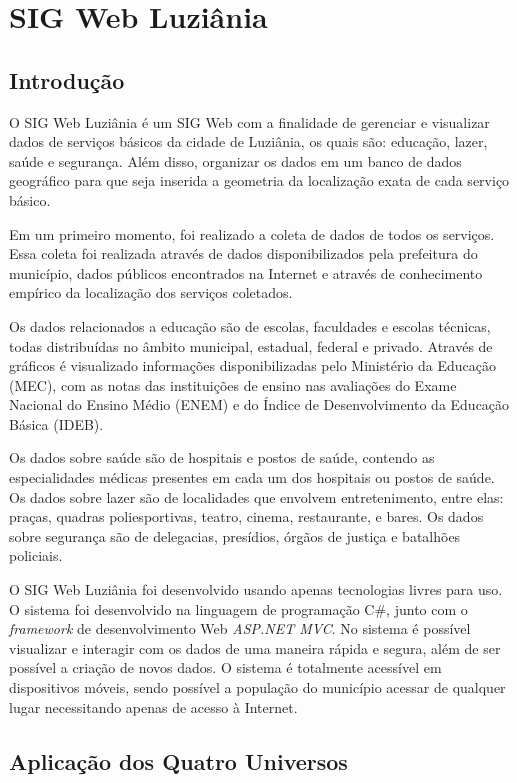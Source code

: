 \chapter{SIG Web Luziânia}
\label{cap:sigluziania}

\section{Introdução}

O SIG Web Luziânia é um SIG Web com a finalidade de gerenciar e visualizar  dados de serviços básicos da cidade de Luziânia, os quais são: educação, lazer, saúde e segurança. Além disso, organizar os dados em um banco de dados geográfico para que seja inserida a geometria da localização exata de cada serviço básico.

Em um primeiro momento, foi realizado a coleta de dados de todos os serviços. Essa coleta foi realizada através de dados disponibilizados pela prefeitura do município, dados públicos encontrados na Internet e através de conhecimento empírico da localização dos serviços coletados.

Os dados relacionados a educação são de escolas, faculdades e escolas técnicas, todas distribuídas no âmbito municipal, estadual, federal e privado. Através de gráficos é visualizado informações disponibilizadas pelo Ministério da Educação (MEC), com as notas das instituições de ensino nas avaliações do Exame Nacional do Ensino Médio (ENEM) e do Índice de Desenvolvimento da Educação Básica (IDEB).

Os dados sobre saúde são de hospitais e postos de saúde, contendo as especialidades médicas presentes em cada um dos hospitais ou postos de saúde. Os dados sobre lazer são de localidades que envolvem entretenimento, entre elas: praças, quadras poliesportivas, teatro, cinema, restaurante, e bares. Os dados sobre segurança são de delegacias, presídios, órgãos de justiça e batalhões policiais.

O SIG Web Luziânia foi desenvolvido usando apenas tecnologias livres para uso. O sistema foi desenvolvido na linguagem de programação C\#, junto com o \textit{framework} de desenvolvimento Web \textit{ASP.NET MVC}. No sistema é possível visualizar e interagir com os dados de uma maneira rápida e segura, além de ser possível a criação de novos dados. O sistema é totalmente acessível em dispositivos móveis, sendo possível a população do município acessar de qualquer lugar necessitando apenas de acesso à Internet.

\section{Aplicação dos Quatro Universos}

